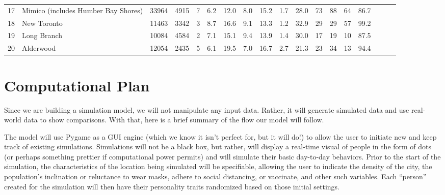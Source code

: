 \documentclass{article}
\begin{document}
\begin{table}[h]
\begin{adjustwidth}{-4cm}{-1cm}
\begin{adjustbox}{width=580}
\begin{tabular}{lllp{40pt}p{55pt}llp{35pt}llllllllll}
                    17 & Mimico (includes Humber Bay Shores) & 33964      & 4915               & 7                  & 6.2           & 12.0     & 8.0                & 15.2       & 1.7        & 28.0              & 73                   & 88                 & 64                     & 86.7           \\
                    18 & New Toronto                         & 11463      & 3342               & 3                  & 8.7           & 16.6     & 9.1                & 13.3       & 1.2        & 32.9              & 29      & 29      & 57             & 99.2         \\
                    19 & Long Branch                         & 10084      & 4584               & 2                  & 7.1           & 15.1     & 9.4                & 13.9       & 1.4        & 30.0              & 17      & 19      & 10             & 87.5         \\
                    20 & Alderwood                           & 12054      & 2435               & 5                  & 6.1           & 19.5     & 7.0                & 16.7       & 2.7        & 21.3              & 23      & 34      & 13             & 94.4
                \end{tabular}
            \end{adjustbox}
        \end{adjustwidth}
    \end{table}


    \section{Computational Plan}

    Since we are building a simulation model, we will not manipulate any input data. Rather, it will generate simulated data and use real-world data to show comparisons. With that, here is a brief summary of the flow our model will follow.
    \bigskip

    The model will use Pygame as a GUI engine (which we know it isn’t perfect for, but it will do!) to allow the user to initiate new and keep track of existing simulations. Simulations will not be a black box, but rather, will display a real-time visual of people in the form of dots (or perhaps something prettier if computational power permits) and will simulate their basic day-to-day behaviors. Prior to the start of the simulation, the characteristics of the location being simulated will be specifiable, allowing the user to indicate the density of the city, the population’s inclination or reluctance to wear masks, adhere to social distancing, or vaccinate, and other such variables. Each “person” created for the simulation will then have their personality traits randomized based on those initial settings.
    \bigskip
\end{document}
